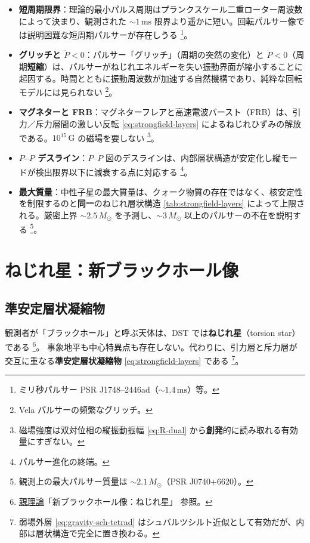 \documentclass[dvipdfmx,a4paper,oneside]{jsbook}
\numberwithin{equation}{chapter}
\begin{document}
\begin{itemize}[leftmargin=2em]
  \item \textbf{短周期限界}：理論的最小パルス周期はプランクスケール二重ローター周波数によって決まり、観測された \(\sim 1\,\mathrm{ms}\) 限界より遥かに短い。回転パルサー像では説明困難な短周期パルサーが存在しうる \footnote{ミリ秒パルサー PSR J1748--2446ad（\(\sim 1.4\,\mathrm{ms}\)）等。}。
  \item \textbf{グリッチと \(\dot{P} < 0\)}：パルサー「グリッチ」（周期の突然の変化）と \(\dot{P} < 0\)（周期\textbf{短縮}）は、パルサーがねじれエネルギーを失い振動界面が縮小することに起因する。時間とともに振動周波数が加速する自然機構であり、純粋な回転モデルには見られない \footnote{Vela パルサーの頻繁なグリッチ。}。
  \item \textbf{マグネターと FRB}：マグネターフレアと高速電波バースト（FRB）は、引力／斥力層間の激しい反転 \eqref{eq:strongfield-layers} によるねじれひずみの解放である。\(10^{15}\,\mathrm{G}\) の磁場を要しない \footnote{磁場強度は双対位相の縦振動振幅 \eqref{eq:R-dual} から\textbf{創発}的に読み取れる有効量にすぎない。}。
  \item \textbf{\(P\)–\(\dot{P}\) デスライン}：\(P\)–\(\dot{P}\) 図のデスラインは、内部層状構造が安定化し縦モードが検出限界以下に減衰する点に対応する \footnote{パルサー進化の終端。}。
  \item \textbf{最大質量}：中性子星の最大質量は、クォーク物質の存在ではなく、核安定性を制限するのと\textbf{同一}のねじれ層状構造 \eqref{tab:strongfield-layers} によって上限される。厳密上界 \(\sim 2.5\,M_\odot\) を予測し、\(\sim 3\,M_\odot\) 以上のパルサーの不在を説明する \footnote{観測上の最大パルサー質量は \(\sim 2.1\,M_\odot\)（PSR J0740+6620）。}。
\end{itemize}

\section{ねじれ星：新ブラックホール像}

\subsection{準安定層状凝縮物}

観測者が「ブラックホール」と呼ぶ天体は、DST では\textbf{ねじれ星}（torsion star）である \footnote{\hyperref[sec:sister-manuscripts]{親理論}「新ブラックホール像：ねじれ星」 参照。}。
事象地平も中心特異点も存在しない。代わりに、引力層と斥力層が交互に重なる\textbf{準安定層状凝縮物} \eqref{eq:strongfield-layers} である \footnote{弱場外層 \eqref{eq:gravity-sch-tetrad} はシュバルツシルト近似として有効だが、内部は層状構造で完全に置き換わる。}。
\end{document}
